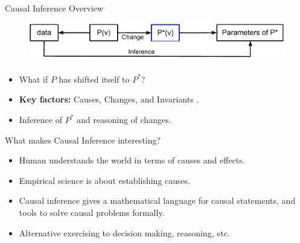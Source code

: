 \begin{frame}{Causal Inference Overview}
\begin{figure}
\includegraphics[scale=0.6]{imgs/causalInf}
\end{figure}
\begin{itemize}
\item What if $P$ has shifted itself to $P^*$?
\item<2-> \textbf{Key factors:} Causes, Changes, and Invariants . 
\item<2-> Inference of $P^*$ and reasoning of changes. 
\end{itemize}
\end{frame}
\begin{frame}{What makes Causal Inference interesting?}
\begin{itemize}
\item Human understands the world in terms of causes and effects.
\item Empirical science is about establishing causes.
\item Causal inference gives a mathematical language for causal
statements, and tools to solve causal problems formally.
\item Alternative exercising to decision making, reasoning, etc.
\end{itemize}
\end{frame}
